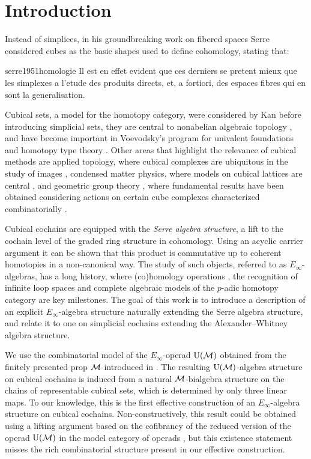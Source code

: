 \section{Introduction} \label{s:introduction}

Instead of simplices, in his groundbreaking work on fibered spaces Serre considered cubes as the basic shapes used to define cohomology, stating that:
\begin{displaycquote}[p.431]{serre1951homologie}
	Il est en effet evident que ces derniers se pretent mieux que les simplexes a l'etude des produits directs, et, a fortiori, des espaces fibres qui en sont la generalisation.
\end{displaycquote}
Cubical sets, a model for the homotopy category, were considered by Kan \cite{kan1955abstract, kan1956abstract} before introducing simplicial sets, they are central to nonabelian algebraic topology \cite{brown2011nonabelian}, and have become important in Voevodsky's program for univalent foundations and homotopy type theory \cite{kapulkin2020straightening, mortberg2017cubical}.
Other areas that highlight the relevance of cubical methods are applied topology, where cubical complexes are ubiquitous in the study of images \cite{tomasz2004computational}, condensed matter physics, where models on cubical lattices are central \cite{baxter1985exactlysolved}, and geometric group theory \cite{gromov1987hyperbolic}, where fundamental results have been obtained considering actions on certain cube complexes characterized combinatorially \cite{agol2013haken}.

Cubical cochains are equipped with the \textit{Serre algebra structure}, a lift to the cochain level of the graded ring structure in cohomology.
Using an acyclic carrier argument it can be shown that this product is commutative up to coherent homotopies in a non-canonical way.
The study of such objects, referred to as $E_\infty$-algebras, has a long history, where (co)homology operations \cite{steenrod1962cohomology, may1970general}, the recognition of infinite loop spaces \cite{boardman1973homotopy, may1972geometry} and complete algebraic models of the $p$-adic homotopy category \cite{mandell2001padic} are key milestones.
The goal of this work is to introduce a description of an explicit $E_\infty$-algebra structure naturally extending the Serre algebra structure, and relate it to one on simplicial cochains extending the Alexander--Whitney algebra structure.

We use the combinatorial model of the $E_\infty$-operad ${\operatorname{U}(\mathcal{M})}$ obtained from the finitely presented prop $\mathcal{M}$ introduced in \cite{medina2020prop1}.
The resulting ${\operatorname{U}(\mathcal{M})}$-algebra structure on cubical cochains is induced from a natural $\mathcal{M}$-bialgebra structure on the chains of representable cubical sets, which is determined by only three linear maps.
To our knowledge, this is the first effective construction of an $E_\infty$-algebra structure on cubical cochains.
Non-constructively, this result could be obtained using a lifting argument based on the cofibrancy of the reduced version of the operad ${\operatorname{U}(\mathcal{M})}$ in the model category of operads \cite{hinich1997homological, berger2003modelcategory}, but this existence statement misses the rich combinatorial structure present in our effective construction.


